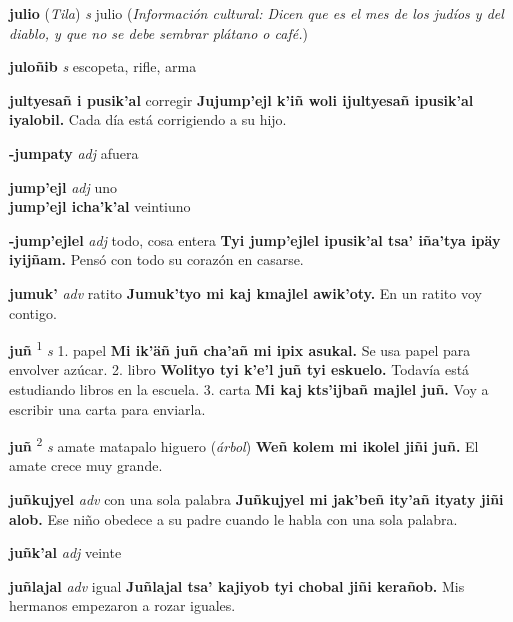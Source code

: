 \documentclass[10pt]{scrbook}
\newcommand{\entry}[1]{\textbf{#1}}
\newcommand{\onedefinition}[1]{#1.}
\newcommand{\defsuperscript}[1]{\textsuperscript{#1}}
\newcommand{\partofspeech}[1]{\textit{#1}}
\newcommand{\spanishtranslation}[1]{#1}
\newcommand{\clarification}[1]{(\textit{#1})}
\newcommand{\cholexample}[1]{\textbf{#1}}
\newcommand{\exampletranslation}[1]{#1}
\newcommand{\relevantdialect}[1]{(\textit{#1})}
\newcommand{\culturalinformation}[1]{(\textit{#1})}
\newcommand{\secondaryentry}[1]{\\\textbf{#1}}
\newcommand{\secondtranslation}[1]{#1}
\begin{document}
\begin{multicols}{2}
\entry{julio}
\relevantdialect{Tila}
\partofspeech{s}
\spanishtranslation{julio}
\culturalinformation{Información cultural: Dicen que es el mes de los judíos y del diablo, y que no se debe sembrar plátano o café.}

\entry{juloñib}
\partofspeech{s}
\spanishtranslation{escopeta, rifle, arma}

\entry{jultyesañ i pusik'al}
\spanishtranslation{corregir}
\cholexample{Jujump'ejl k'iñ woli ijultyesañ ipusik'al iyalobil.}
\exampletranslation{Cada día está corrigiendo a su hijo.}

\entry{-jumpaty}
\partofspeech{adj}
\spanishtranslation{afuera}

\entry{jump'ejl}
\partofspeech{adj}
\spanishtranslation{uno}
\secondaryentry{jump'ejl icha'k'al}
\secondtranslation{veintiuno}

\entry{-jump'ejlel}
\partofspeech{adj}
\spanishtranslation{todo, cosa entera}
\cholexample{Tyi jump'ejlel ipusik'al tsa' iña'tya ipäy iyijñam.}
\exampletranslation{Pensó con todo su corazón en casarse.}

\entry{jumuk'}
\partofspeech{adv}
\spanishtranslation{ratito}
\cholexample{Jumuk'tyo mi kaj kmajlel awik'oty.}
\exampletranslation{En un ratito voy contigo.}

\entry{juñ}
\defsuperscript{1}
\partofspeech{s}
\onedefinition{1}
\spanishtranslation{papel}
\cholexample{Mi ik'äñ juñ cha'añ mi ipix asukal.}
\exampletranslation{Se usa papel para envolver azúcar.}
\onedefinition{2}
\spanishtranslation{libro}
\cholexample{Wolityo tyi k'e'l juñ tyi eskuelo.}
\exampletranslation{Todavía está estudiando libros en la escuela.}
\onedefinition{3}
\spanishtranslation{carta}
\cholexample{Mi kaj kts'ijbañ majlel juñ.}
\exampletranslation{Voy a escribir una carta para enviarla.}

\entry{juñ}
\defsuperscript{2}
\partofspeech{s}
\spanishtranslation{amate}
\spanishtranslation{matapalo}
\spanishtranslation{higuero}
\clarification{árbol}
\cholexample{Weñ kolem mi ikolel jiñi juñ.}
\exampletranslation{El amate crece muy grande.}

\entry{juñkujyel}
\partofspeech{adv}
\spanishtranslation{con una sola palabra}
\cholexample{Juñkujyel mi jak'beñ ity'añ ityaty jiñi alob.}
\exampletranslation{Ese niño obedece a su padre cuando le habla con una sola palabra.}

\entry{juñk'al}
\partofspeech{adj}
\spanishtranslation{veinte}

\entry{juñlajal}
\partofspeech{adv}
\spanishtranslation{igual}
\cholexample{Juñlajal tsa' kajiyob tyi chobal jiñi kerañob.}
\exampletranslation{Mis hermanos empezaron a rozar iguales.}


\end{multicols}
\end{document}
